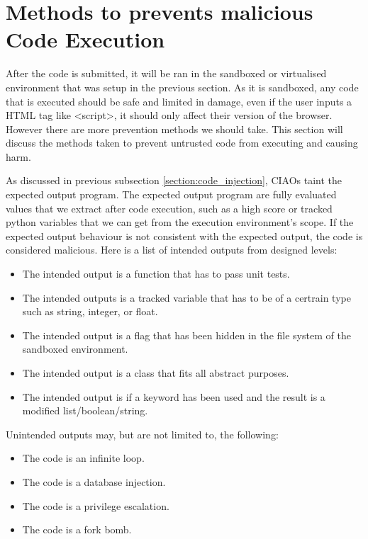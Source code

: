 \section{Methods to prevents malicious Code Execution}
After the code is submitted, it will be ran in the sandboxed or virtualised environment that was setup in the previous section. As it is sandboxed, any code that is executed should be safe and limited in damage, even if the user inputs a HTML tag like <script>, it should only affect their version of the browser. However there are more prevention methods we should take. This section will discuss the methods taken to prevent untrusted code from executing and causing harm.

As discussed in previous subsection \ref{section:code_injection}, CIAOs taint the expected output program. The expected output program are fully evaluated values that we extract after code execution, such as a high score or tracked python variables that we can get from the execution environment's scope. If the expected output behaviour is not consistent with the expected output, the code is considered malicious. Here is a list of intended outputs from designed levels:
\begin{itemize}
    \item The intended output is a function that has to pass unit tests.
    \item The intended outputs is a tracked variable that has to be of a certrain type such as string, integer, or float.
    \item The intended output is a flag that has been hidden in the file system of the sandboxed environment.
    \item The intended output is a class that fits all abstract purposes.
    \item The intended output is if a keyword has been used and the result is a modified list/boolean/string.
\end{itemize}
Unintended outputs may, but are not limited to, the following:
\begin{itemize}
    \item The code is an infinite loop.
    \item The code is a database injection.
    \item The code is a privilege escalation.
    \item The code is a fork bomb.
\end{itemize}



